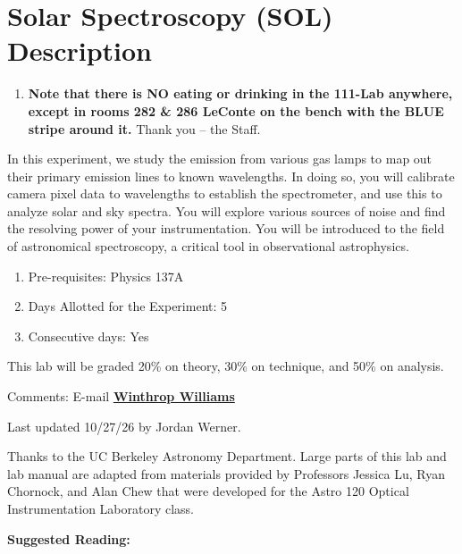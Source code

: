 \documentclass{../lab}
\begin{document}
\maketitle

\tableofcontents

\section{Solar Spectroscopy (SOL) Description}

\begin{enumerate}
    \item \textbf{Note that there is NO eating or drinking in the 111-Lab anywhere, except in rooms 282 \& 286 LeConte on the bench with the BLUE stripe around it.} Thank you -- the Staff.

\end{enumerate}

In this experiment, we study the emission from various gas lamps to map out their primary emission lines to known wavelengths. In doing so, you will calibrate camera pixel data to wavelengths to establish the spectrometer, and use this to analyze solar and sky spectra. You will explore various sources of noise and find the resolving power of your instrumentation. You will be introduced to the field of astronomical spectroscopy, a critical tool in observational astrophysics.

\begin{enumerate}
    \item Pre-requisites: Physics 137A

    \item Days Allotted for the Experiment: 5

    \item Consecutive days: Yes

\end{enumerate}


This lab will be graded 20\% on theory, 30\% on technique, and 50\% on analysis.

Comments: E-mail \href{\MailLabManager}{\textbf{Winthrop Williams}}

Last updated 10/27/26 by Jordan Werner.

Thanks to the UC Berkeley Astronomy Department. Large parts of this lab and lab manual are adapted from materials provided by Professors Jessica Lu, Ryan Chornock, and Alan Chew that were developed for the Astro 120 Optical Instrumentation Laboratory class.


\noindent\textbf{Suggested Reading:}
\end{document}
